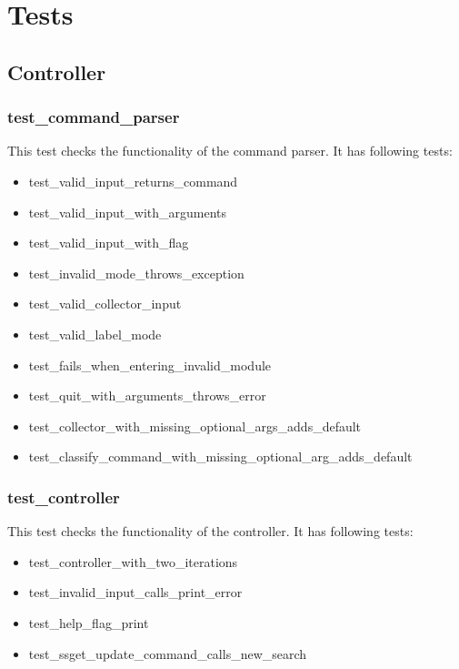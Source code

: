 \documentclass[parskip=full]{scrartcl}
\begin{document}
\section{Tests}

\subsection{Controller}
\subsubsection{test\_command\_parser}
This test checks the functionality of the command parser.
It has following tests:

\begin{itemize}

\item test\_valid\_input\_returns\_command

\item test\_valid\_input\_with\_arguments

\item test\_valid\_input\_with\_flag

\item test\_invalid\_mode\_throws\_exception

\item test\_valid\_collector\_input

\item test\_valid\_label\_mode

\item test\_fails\_when\_entering\_invalid\_module

\item test\_quit\_with\_arguments\_throws\_error

\item test\_collector\_with\_missing\_optional\_args\_adds\_default

\item test\_classify\_command\_with\_missing\_optional\_arg\_adds\_default

\end{itemize}

\subsubsection{test\_controller}
This test checks the functionality of the controller.
It has following tests:

\begin{itemize}

\item test\_controller\_with\_two\_iterations

\item test\_invalid\_input\_calls\_print\_error

\item test\_help\_flag\_print

\item test\_ssget\_update\_command\_calls\_new\_search

\end{itemize}
\end{document}
